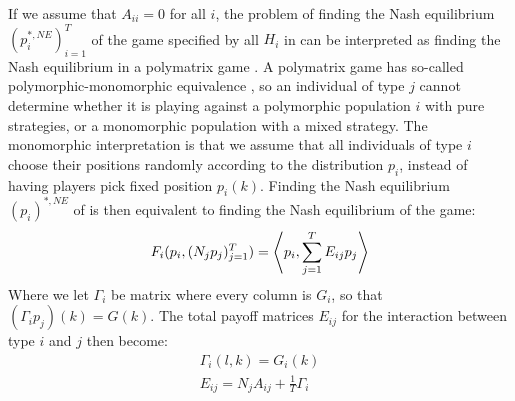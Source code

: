 

If we assume that $A_{ii}=0$ for all $i$, the problem of finding the Nash equilibrium $(p_i^{*,NE})_{i=1}^T$ of the game specified by all $H_i$ in  can be interpreted as finding the Nash equilibrium in a polymatrix game \citep{howson1972equilibria, eaves1973polymatrix}. A polymatrix game has so-called polymorphic-monomorphic equivalence \citep{broom2013game, eaves1973polymatrix}, so an individual of type $j$ cannot determine whether it is playing against a polymorphic population $i$ with pure strategies, or a monomorphic population with a mixed strategy. The monomorphic interpretation is that we assume that all individuals of type $i$ choose their positions randomly according to the distribution $p_i$, instead of having players pick fixed position $p_i(k)$. Finding the Nash equilibrium $(p_i)^{*,NE}$ of  is then equivalent to finding the Nash equilibrium of the game:
\begin{equation}
  \label{eq:poly_fitness}
  F_i(p_i, (N_j p_j)_{j=1}^T) = \left \langle p_i,\sum_{j=1}^T E_{ij} p_j \right \rangle
\end{equation}
Where we let $\Gamma_i$ be matrix where every column is $G_i$, so that $(\Gamma_i p_j)(k) = G(k)$. The total payoff matrices $E_{ij}$ for the interaction between type $i$ and $j$ then become:
\begin{equation}
  \label{eq:disc_tot_payoff}
  \begin{split}
  \Gamma_i(l,k) = G_i(k) \\
    E_{ij} = N_j A_{ij} + \frac{1}{T}\Gamma_i%
  \end{split}
\end{equation}

